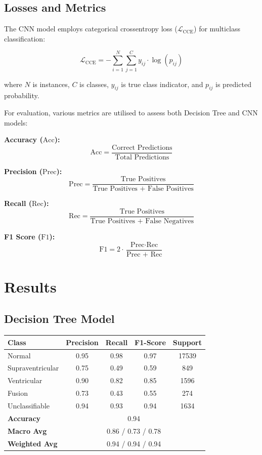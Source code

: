 \documentclass[]{acmsiggraph}
\begin{document}
\subsection{Losses and Metrics}

The CNN model employs categorical crossentropy loss (\(\mathcal{L}_{\text{CCE}}\)) for multiclass classification:

\[
\mathcal{L}_{\text{CCE}} = - \sum_{i=1}^{N} \sum_{j=1}^{C} y_{ij} \cdot \log(p_{ij})
\]

where \(N\) is instances, \(C\) is classes, \(y_{ij}\) is true class indicator, and \(p_{ij}\) is predicted probability.

For evaluation, various metrics are utilised to assess both Decision Tree and CNN models:

\textbf{Accuracy (\(\text{Acc}\)):}
\[
\text{Acc} = \frac{\text{Correct Predictions}}{\text{Total Predictions}}
\]

\textbf{Precision (\(\text{Prec}\)):}
\[
\text{Prec} = \frac{\text{True Positives}}{\text{True Positives + False Positives}}
\]

\textbf{Recall (\(\text{Rec}\)):}
\[
\text{Rec} = \frac{\text{True Positives}}{\text{True Positives + False Negatives}}
\]

\textbf{F1 Score (\(\text{F1}\)):}
\[
\text{F1} = 2 \cdot \frac{\text{Prec} \cdot \text{Rec}}{\text{Prec + Rec}}
\]
\section{Results} \label{sec:overview}

\subsection{Decision Tree Model}

\begin{center}
\begin{tabular}{lcccc}
\hline
\textbf{Class} & \textbf{Precision} & \textbf{Recall} & \textbf{F1-Score} & \textbf{Support} \\
\hline
Normal & 0.95 & 0.98 & 0.97 & 17539 \\
Supraventricular & 0.75 & 0.49 & 0.59 & 849 \\
Ventricular & 0.90 & 0.82 & 0.85 & 1596 \\
Fusion & 0.73 & 0.43 & 0.55 & 274 \\
Unclassifiable & 0.94 & 0.93 & 0.94 & 1634 \\
\hline
\textbf{Accuracy} & \multicolumn{4}{c}{0.94} \\
\textbf{Macro Avg} & \multicolumn{4}{c}{0.86 / 0.73 / 0.78} \\
\textbf{Weighted Avg} & \multicolumn{4}{c}{0.94 / 0.94 / 0.94} \\
\hline
\end{tabular}
\end{center}
\end{document}
